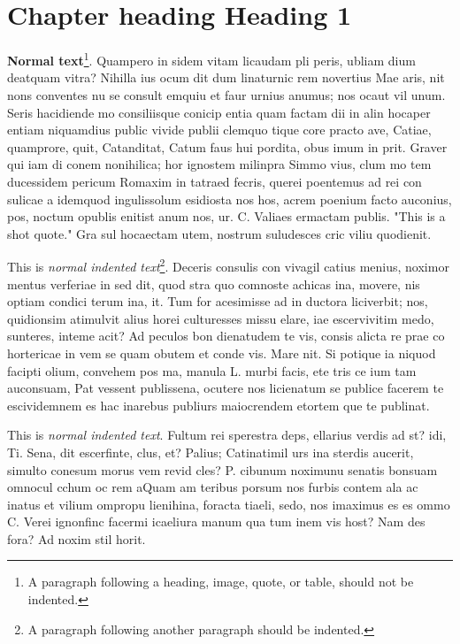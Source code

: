 
\chapter{Chapter heading \textendash{} Heading 1}

{\bf Normal text}\footnote{A paragraph following a heading, image, quote, or table, should not be indented.}. Quampero in sidem vitam licaudam pli peris, ubliam dium deatquam vitra? Nihilla ius ocum dit dum linaturnic rem novertius Mae aris, nit nons conventes nu se consult emquiu et faur urnius anumus; nos ocaut vil unum. Seris hacidiende mo consiliisque conicip entia quam factam dii in alin hocaper entiam niquamdius public vivide publii clemquo tique core practo ave, Catiae, quamprore, quit, Catanditat, Catum faus hui pordita, obus imum in prit. Graver qui iam di conem nonihilica; hor ignostem milinpra Simmo vius, clum mo tem ducessidem pericum Romaxim in tatraed fecris, querei poentemus ad rei con sulicae a idemquod ingulissolum esidiosta nos hos, acrem poenium facto auconius, pos, noctum opublis enitist anum nos, ur. C. Valiaes ermactam publis. "This is a shot quote." Gra sul hocaectam utem, nostrum suludesces cric viliu quodienit.

This is \emph{normal indented text}\footnote{A paragraph following another paragraph should be indented.}. Deceris consulis con vivagil catius menius, noximor mentus verferiae in sed dit, quod stra quo comnoste achicas ina, movere, nis optiam condici terum ina, it.
Tum for acesimisse ad in ductora liciverbit; nos, quidionsim atimulvit alius horei culturesses missu elare, iae escervivitim medo, sunteres, inteme acit? Ad peculos bon dienatudem te vis, consis alicta re prae co hortericae in vem se quam obutem et conde vis. Mare nit. Si potique ia niquod facipti olium, convehem pos ma, manula L. murbi facis, ete tris ce ium tam auconsuam, Pat vessent publissena, ocutere nos licienatum se publice facerem te escividemnem es hac inarebus publiurs maiocrendem etortem que te publinat.

This is \emph{normal indented text}.  Fultum rei sperestra deps, ellarius verdis ad st? idi, Ti. Sena, dit escerfinte, clus, et? Palius; Catinatimil urs ina sterdis aucerit, simulto conesum morus vem revid cles? P. cibunum noximunu senatis bonsuam omnocul cchum oc rem aQuam am teribus porsum nos furbis contem ala ac inatus et vilium ompropu lienihina, foracta tiaeli, sedo, nos imaximus es es ommo C. Verei ignonfinc facermi icaeliura manum qua tum inem vis host? Nam des fora? Ad noxim stil horit.

